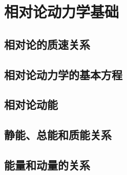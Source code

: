 \section{相对论动力学基础}
    \subsection{相对论的质速关系}
    \subsection{相对论动力学的基本方程}
    \subsection{相对论动能}
    \subsection{静能、总能和质能关系}
    \subsection{能量和动量的关系}

\endinput